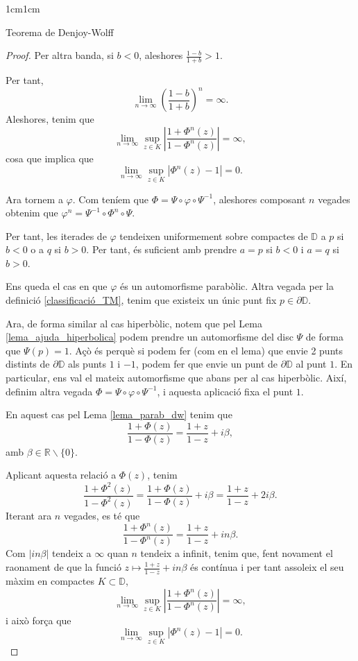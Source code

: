 \begin{adjustwidth}{1cm}{1cm}
\begin{subsection}{Teorema de Denjoy-Wolff}
\begin{proof}
        Per altra banda, si $b<0$, aleshores $\frac{1-b}{1+b}>1$.

        Per tant, 
        \[
            \lim_{n\to \infty}\left(\frac{1-b}{1+b}\right)^n=\infty.
        \]
        Aleshores, tenim que 
        \[
            \lim_{n\to\infty}\sup_{z\in K}\left|\frac{1+\Phi^n(z)}{1-\Phi^n(z)}\right|=\infty, 
        \]
        cosa que implica que 
        \[
            \lim_{n\to\infty}\sup_{z\in K}|\Phi^n(z)-1|=0.
        \]

        Ara tornem a $\varphi$. Com teníem que $\Phi=\Psi\circ\varphi\circ\Psi^{-1}$, aleshores composant $n$ vegades obtenim que $\varphi^n=\Psi^{-1}\circ\Phi^n\circ\Psi$.

        Per tant, les iterades de $\varphi$ tendeixen uniformement sobre compactes de $\mathbb{D}$ a $p$ si $b<0$ o a $q$ si $b>0$. Per tant, és suficient amb prendre $a=p$ si $b<0$ i $a=q$ si $b>0$.

        Ens queda el cas en que $\varphi$ és un automorfisme parabòlic. Altra vegada per la definició \ref{classificació_TM}, tenim que existeix un únic punt fix $p\in\partial \mathbb{D}$.

        Ara, de forma similar al cas hiperbòlic, notem que pel Lema \ref{lema_ajuda_hiperbolica} podem prendre un automorfisme del disc $\Psi$ de forma que $\Psi(p)=1$. Açò és perquè si podem fer (com en el lema) que envie 2 punts distints de $\partial \mathbb{D}$ als punts $1$ i $-1$, podem fer que envie un punt de $\partial \mathbb{D}$ al punt $1$. En particular, ens val el mateix automorfisme que abans per al cas hiperbòlic. Així, definim altra vegada $\Phi=\Psi\circ\varphi\circ\Psi^{-1}$, i aquesta aplicació fixa el punt $1$.

        En aquest cas pel Lema \ref{lema_parab_dw} tenim que  
        \[
            \frac{1+\Phi(z)}{1-\Phi(z)}=\frac{1+z}{1-z}+i\beta,
        \]
        amb $\beta\in \mathbb{R}\backslash\{0\}$.

        Aplicant aquesta relació a $\Phi(z)$, tenim
        \[
            \frac{1+\Phi^2(z)}{1-\Phi^2(z)}=\frac{1+\Phi(z)}{1-\Phi(z)}+i\beta=\frac{1+z}{1-z}+2i\beta.
        \]
        Iterant ara $n$ vegades, es té que 
        \[
            \frac{1+\Phi^n(z)}{1-\Phi^n(z)}=\frac{1+z}{1-z}+in\beta.
        \]
        Com $|in\beta|$ tendeix a $\infty$ quan $n$ tendeix a infinit, tenim que, fent novament el raonament de que la funció $z\mapsto \frac{1+z}{1-z}+in\beta$ és contínua i per tant assoleix el seu màxim en compactes $K\subset \mathbb{D}$, 
        \[
            \lim_{n\to\infty}\sup_{z\in K}\left|\frac{1+\Phi^n(z)}{1-\Phi^n(z)}\right|=\infty, 
        \]
        i això força que
        \[
            \lim_{n\to\infty}\sup_{z\in K}|\Phi^n(z)-1|=0.
        \] 


\end{proof}
\end{subsection}
\end{adjustwidth}
